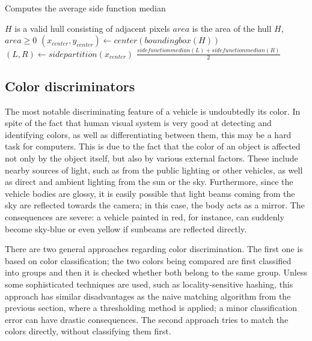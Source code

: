 \documentclass[times, utf8, zavrsni]{fer}
\begin{document}
\begin{algorithm} 
\caption{Computes the average side function median}
\label{algo:side-function-median}
\begin{algorithmic}
\REQUIRE $H$ is a valid hull consisting of adjacent pixels
\ENSURE $area$ is the area of the hull $H$, $area \geq 0$
\STATE $(x_{center}, y_{center}) \gets center(boundingbox(H))$
\STATE $(L, R) \gets sidepartition(x_{center})$
\RETURN $\frac{sidefunctionmedian(L) + sidefunctionmedian(R)}{2}$
\end{algorithmic}
\end{algorithm}

\subsection{Color discriminators}

The most notable discriminating feature of a vehicle is undoubtedly its color.
In spite of the fact that human visual system is very good at detecting and
identifying colors, as well as differentiating between them, this may be a hard
task for computers. This is due to the fact that the color of an object is
affected not only by the object itself, but also by various external factors.
These include nearby sources of light, such as from the public lighting or other
vehicles, as well as direct and ambient lighting from the sun or the sky.
Furthermore, since the vehicle bodies are glossy, it is easily possible that
light beams coming from the sky are reflected towards the camera; in this case,
the body acts as a mirror. The consequences are severe: a vehicle painted in
red, for instance, can suddenly become sky-blue or even yellow if sunbeams are
reflected directly.

There are two general approaches regarding color discrimination. The first one
is based on color classification; the two colors being compared are first
classified into groups and then it is checked whether both belong to the same
group. Unless some sophisticated techniques are used, such as locality-sensitive
hashing, this approach has similar disadvantages as the naive matching algorithm
from the previous section, where a thresholding method is applied; 
a minor classification error can have drastic consequences. The second approach tries to match the colors directly, without classifying
them first.
\end{document}
